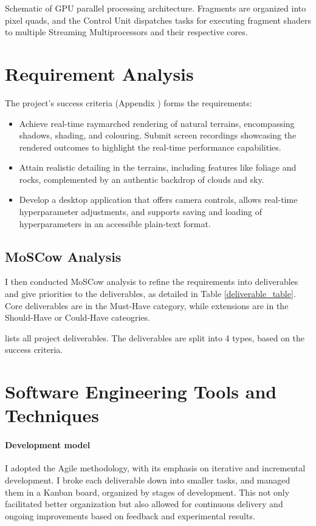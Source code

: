 {Schematic of GPU parallel processing architecture. Fragments are organized into pixel quads, and the Control Unit dispatches tasks for executing fragment shaders to multiple Streaming Multiprocessors and their respective cores.}

\section{Requirement Analysis}
\label{sec:Requirement}

The project’s success criteria (Appendix ) forms the requirements:

\begin{itemize}
    \item Achieve real-time raymarched rendering of natural terrains, encompassing shadows, shading, and colouring. Submit screen recordings showcasing the rendered outcomes to highlight the real-time performance capabilities.
    \item Attain realistic detailing in the terrains, including features like foliage and rocks, complemented by an authentic backdrop of clouds and sky.
    \item Develop a desktop application that offers camera controls, allows real-time hyperparameter adjustments, and supports saving and loading of hyperparameters in an accessible plain-text format.
\end{itemize}

\subsection{MoSCow Analysis}

I then conducted MoSCow analysis to refine the requirements into deliverables and give priorities to the deliverables, as detailed in Table \ref{deliverable_table}. Core deliverables are in the Must-Have category, while extensions are in the Should-Have or Could-Have cateogries. 

{lists all project deliverables. The deliverables are split into 4 types, based on the success criteria.}

\section{Software Engineering Tools and Techniques}
\label{sec:Software Engineering}

\paragraph{Development model}
I adopted the Agile methodology, with its emphasis on iterative and incremental development. I broke each deliverable down into smaller tasks, and managed them in a Kanban board, organized by stages of development. This not only facilitated better organization but also allowed for continuous delivery and ongoing improvements based on feedback and experimental results.

